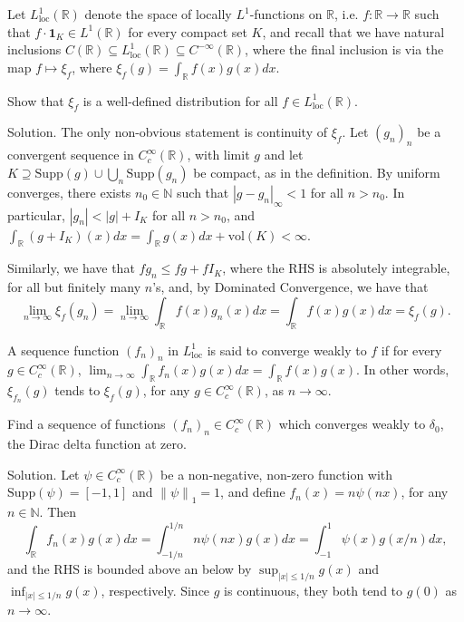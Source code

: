 \documentclass[12pt, draft,reqno,a4paper, twoside]{amsproc}
\newcommand{\id}{\mathbf{1}}
\newcommand{\supp}{\mathrm{Supp}}
\newcommand{\dbN}{\mathbb N}
\newcommand{\dbR}{\mathbb R}
\newcommand{\norm}[1]{\left\|#1\right\|}
\newcommand{\abs}[1]{\left|#1\right|}
\newcommand{\loc}{\mathrm{loc}}
\newenvironment{sol}{\sc Solution. \rm}{\hfill \qedsymbol\bigskip}
\begin{document}
Let $L_\loc^1(\dbR)$ denote the space of locally $L^1$-functions on $\dbR$, i.e. $f:\dbR\to \dbR$ such that $f\cdot \id_K\in L^1(\dbR)$ for every compact set $K$, and recall that we have natural inclusions $C(\dbR)\subseteq L_\loc^1(\dbR)\subseteq C^{-\infty}(\dbR)$, where the final inclusion is via the map $f\mapsto\xi_f$, where $\xi_f(g)=\int_{\dbR}f(x)g(x)dx$. 
\begin{exer}Show that $\xi_f$ is a well-defined distribution for all $f\in L^1_\loc(\dbR)$. 
\end{exer}
\begin{sol}
	The only non-obvious statement is continuity of $\xi_f$. Let $(g_n)_n$ be a convergent sequence in $C_c^\infty(\dbR)$, with limit $g$ and let $K\supseteq\supp(g)\cup \bigcup_n \supp (g_n)$ be compact, as in the definition. By uniform converges, there exists $n_0\in \dbN$ such that $\abs{g-g_n}_\infty<1$ for all $n>n_0$. In particular, $\abs{g_n}<\abs{g}+I_K$ for all $n>n_0$, and $\int_{\dbR}(g+I_K)(x)dx=\int_\dbR g(x)dx+\mathrm{vol}(K)<\infty$. 

	Similarly, we have that $fg_n\le fg+fI_K$, where the RHS is absolutely integrable,  for all but finitely many $n$'s, and, by Dominated Convergence, we have that 
	\[\lim_{n\to\infty}\xi_f(g_n)=\lim_{n\to\infty}\int_\dbR f(x)g_n(x)dx=\int_{\dbR}f(x)g(x)dx=\xi_f(g).\]
\end{sol}

\begin{defi}[Weak convergence in $L^1_\loc$] A sequence function $(f_n)_n$ in $L^1_\loc$ is said to converge weakly to $f$ if for every $g\in C_c^\infty(\dbR)$, $\lim_{n\to\infty}\int_{\dbR}f_n(x)g(x)dx=\int_{\dbR}f(x)g(x)$. In other words, $\xi_{f_n}(g)$ tends to $\xi_f(g)$, for any $g\in C_c^\infty(\dbR)$, as $n\to\infty$. 
\end{defi}

\begin{exer}Find a sequence of functions $(f_n)_n\in C_c^\infty(\dbR)$ which converges weakly to $\delta_0$, the Dirac delta function at zero.
\end{exer}
\begin{sol}Let $\psi\in C_c^\infty(\dbR)$ be a non-negative, non-zero function with $\supp(\psi)=[-1,1]$ and $\norm{\psi}_1=1$, and define $f_n(x)=n\psi(nx)$, for any $n\in\dbN$. Then 
\[\int_\dbR f_n(x)g(x)dx=\int_{-1/n}^{1/n} n\psi(nx)g(x)dx=\int_{-1}^{1}\psi(x)g(x/n)dx,\]
and the RHS is bounded above an below by $\sup_{\abs{x}\le 1/n}g(x)$ and $\inf_{\abs{x}\le 1/n}g(x)$, respectively. Since $g$ is continuous, they both tend to $g(0)$ as $n\to\infty$.
\end{sol}
\end{document}
